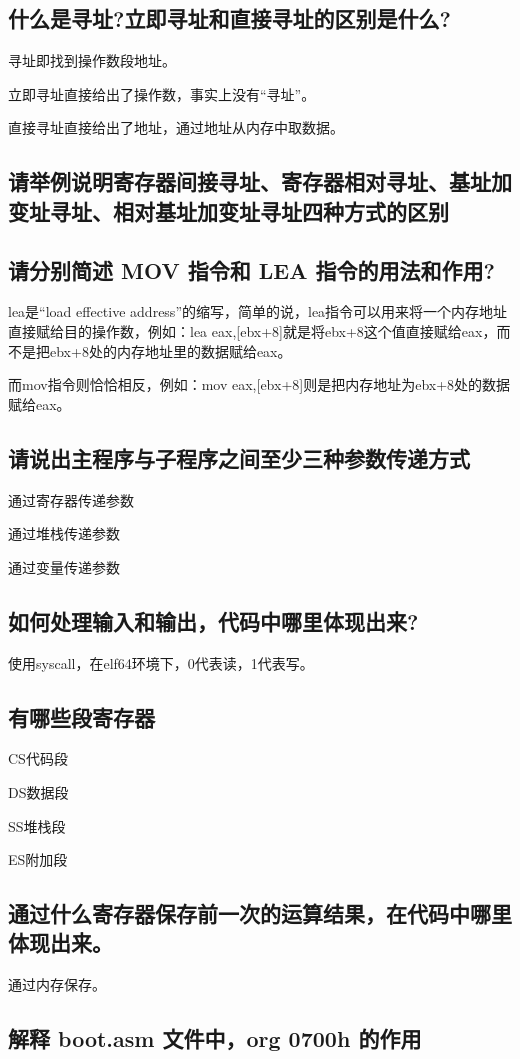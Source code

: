 \documentclass{article}
\begin{document}
\subsection{什么是寻址?立即寻址和直接寻址的区别是什么?}
寻址即找到操作数段地址。

立即寻址直接给出了操作数，事实上没有“寻址”。

直接寻址直接给出了地址，通过地址从内存中取数据。
\subsection{请举例说明寄存器间接寻址、寄存器相对寻址、基址加变址寻址、相对基址加变址寻址四种方式的区别}

\subsection{请分别简述 MOV 指令和 LEA 指令的用法和作用?}
lea是“load effective address”的缩写，简单的说，lea指令可以用来将一个内存地址直接赋给目的操作数，例如：lea eax,[ebx+8]就是将ebx+8这个值直接赋给eax，而不是把ebx+8处的内存地址里的数据赋给eax。

而mov指令则恰恰相反，例如：mov eax,[ebx+8]则是把内存地址为ebx+8处的数据赋给eax。

\subsection{请说出主程序与子程序之间至少三种参数传递方式}
通过寄存器传递参数

通过堆栈传递参数

通过变量传递参数
\subsection{如何处理输入和输出，代码中哪里体现出来?}
使用syscall，在elf64环境下，0代表读，1代表写。

\subsection{有哪些段寄存器}
CS代码段

DS数据段

SS堆栈段

ES附加段
\subsection{通过什么寄存器保存前一次的运算结果，在代码中哪里体现出来。}
通过内存保存。
\subsection{解释 boot.asm 文件中，org 0700h 的作用}
\end{document}
